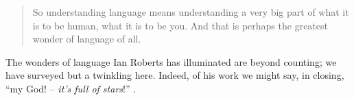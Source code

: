 \documentclass[output=paper]{langsci/langscibook}
\begin{document}
\begin{quote}
    So understanding language means understanding a very big part of what it is
    to be human, what it is to be you. And that is perhaps the greatest wonder
    of language of all. \citep[182]{Roberts2017}
\end{quote}

The wonders of language Ian Roberts has illuminated are beyond counting; we
have surveyed but a twinkling here. Indeed, of his work we might say, in
closing, “my God! -- \emph{it’s full of stars}!” \citep[202]{Clarke1968}.

\printchapterglossary{}

{\sloppy
\printbibliography[heading=subbibliography,notkeyword=this]
}
\end{document}
